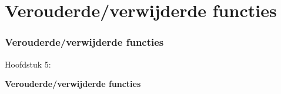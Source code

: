 %

\section{Verouderde/verwijderde functies}
\begin{frame}[fragile]
	\frametitle{Verouderde/verwijderde functies}

	\begin{center}\huge{Hoofdstuk 5:}\end{center}
	\begin{center}\huge{\color{typo3darkgrey}\textbf{Verouderde/verwijderde functies}}\end{center}

\end{frame}

